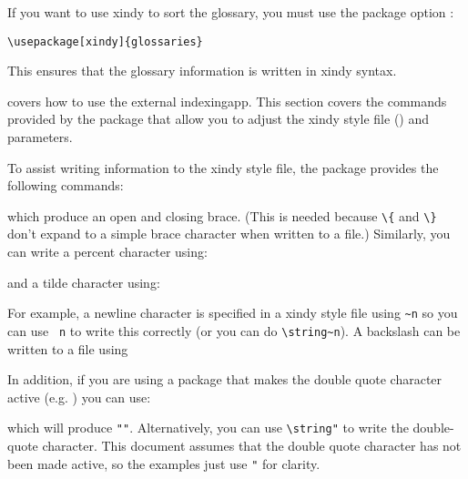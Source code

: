 \documentclass[report,inlinetitle]{nlctdoc}
\begin{document}
If you want to use \gls{xindy} to sort the glossary, you
must use the package option :
\begin{verbatim}
\usepackage[xindy]{glossaries}
\end{verbatim}
This ensures that the glossary information is written in 
\gls*{xindy} syntax.

 covers how to use the external
\gls{indexingapp}. This section covers the commands provided
by the  package that allow you to adjust the
\gls{xindy} style file () and parameters.

To assist writing information to the \gls{xindy} style
file, the  package provides the following
commands:
\begin{definition}[\DescribeMacro{\glsopenbrace}]
\end{definition}
\begin{definition}[\DescribeMacro{\glsclosebrace}]
\end{definition}
which produce an open and closing brace. (This is needed because
\verb|\{| and \verb|\}| don't expand to a simple brace character
when written to a file.) Similarly, you can write a percent
character using:
\begin{definition}[\DescribeMacro{\glspercentchar}]
\end{definition}
and a tilde character using:
\begin{definition}[\DescribeMacro{\glstildechar}]
\end{definition}
For example, a newline character is specified in a \gls{xindy} style
file using \verb|~n| so you can use \texttt{ n}
to write this correctly (or you can do \verb|\string~n|).
A backslash can be written to a file using
\begin{definition}[\DescribeMacro{\glsbackslash}]
\end{definition}

In addition, if you are using a package that makes the double
quote character active (e.g. ) you can use:
\begin{definition}[\DescribeMacro{\glsquote}]
\end{definition}
which will produce \verb|"|\verb|"|. Alternatively,
you can use \verb|\string"| to write the double-quote character. 
This document assumes that the double quote character has not been
made active, so the examples just use \verb|"| for clarity.
\end{document}
